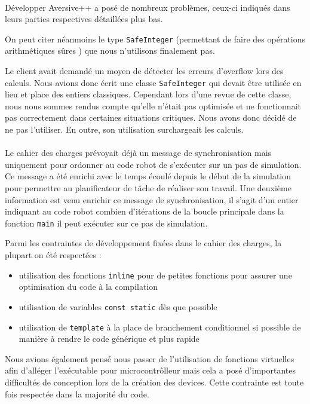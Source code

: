 \paragraph{} %

Développer Aversive++ a posé de nombreux problèmes, ceux-ci indiqués dans leurs parties respectives détaillées plus bas.

On peut citer néanmoins le type \texttt{SafeInteger} (permettant de faire des opérations arithmétiques \og sûres \fg) que nous n'utilisons finalement pas.

Le client avait demandé un moyen de détecter les erreurs d'overflow lors des calculs. Nous avions donc écrit une classe \texttt{SafeInteger} qui devait être utilisée en lieu et place des entiers classiques. Cependant lors d'une revue de cette classe, nous nous sommes rendus compte qu'elle n'était pas optimisée et ne fonctionnait pas correctement dans certaines situations critiques. Nous avons donc décidé de ne pas l'utiliser. En outre, son utilisation surchargeait les calculs.

\paragraph{} %
Le cahier des charges prévoyait déjà un message de synchronisation mais uniquement pour ordonner au code robot de s'exécuter sur un pas de simulation. Ce message a été enrichi avec le temps écoulé depuis le début de la simulation pour permettre au planificateur de tâche de réaliser son travail. Une deuxième information est venu enrichir ce message de synchronisation, il s'agit d'un entier indiquant au code robot combien d'itérations de la boucle principale dans la fonction \texttt{main} il peut exécuter sur ce pas de simulation.

Parmi les contraintes de développement fixées dans le cahier des charges, la plupart on été respectées :

\begin{itemize}
\item utilisation des fonctions \texttt{inline} pour de petites fonctions pour assurer une optimisation du code à la compilation
\item utilisation de variables \texttt{const static} dès que possible
\item utilisation de \texttt{template} à la place de branchement conditionnel si possible de manière à rendre le code générique et plus rapide
\end{itemize}
Nous avions également pensé nous passer de l'utilisation de fonctions virtuelles afin d'alléger l'exécutable pour microcontrôlleur mais cela a posé d'importantes difficultés de conception lors de la création des devices. Cette contrainte est toute fois respectée dans la majorité du code.

